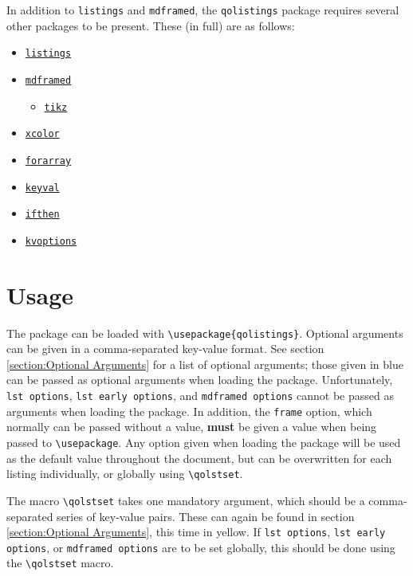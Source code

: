 \documentclass{article}
\newcommand{\ttt}[1]{\texttt{#1}}
\begin{document}
In addition to \ttt{listings} and \ttt{mdframed}, the \ttt{qolistings} package requires several other packages to be present. These (in full) are as follows:
\begin{itemize}
    \item \href{https://www.ctan.org/pkg/listings}{\texttt{listings}}
    \item \href{https://ctan.org/pkg/mdframed}{\ttt{mdframed}}
    \begin{itemize}
        \item \href{https://www.ctan.org/pkg/pgf}{\ttt{tikz}}
    \end{itemize}
    \item \href{https://www.ctan.org/pkg/xcolor}{\ttt{xcolor}}
    \item \href{https://www.ctan.org/pkg/forarray}{\ttt{forarray}}
    \item \href{https://www.ctan.org/pkg/keyval}{\ttt{keyval}}
    \item \href{https://www.ctan.org/pkg/ifthen}{\ttt{ifthen}}
    \item \href{https://www.ctan.org/pkg/kvoptions}{\ttt{kvoptions}}
\end{itemize}

\section{Usage}

The package can be loaded with \verb|\usepackage{qolistings}|. Optional arguments can be given in a comma-separated key-value format. See section \ref{section:Optional Arguments} for a list of optional arguments; those given in \color{Accent2}blue\normalcolor{} can be passed as optional arguments when loading the package. Unfortunately, \texttt{lst options}, \ttt{lst early options}, and \ttt{mdframed options} cannot be passed as arguments when loading the package. In addition, the \ttt{frame} option, which normally can be passed without a value, \textbf{must} be given a value when being passed to \verb|\usepackage|. Any option given when loading the package will be used as the default value throughout the document, but can be overwritten for each listing individually, or globally using \verb|\qolstset|.

The macro \verb|\qolstset| takes one mandatory argument, which should be a comma-separated series of key-value pairs. These can again be found in section \ref{section:Optional Arguments}, this time in \color{Accent1}yellow\normalcolor{}. If \texttt{lst options}, \ttt{lst early options}, or \ttt{mdframed options} are to be set globally, this should be done using the \verb|\qolstset| macro.
\end{document}

